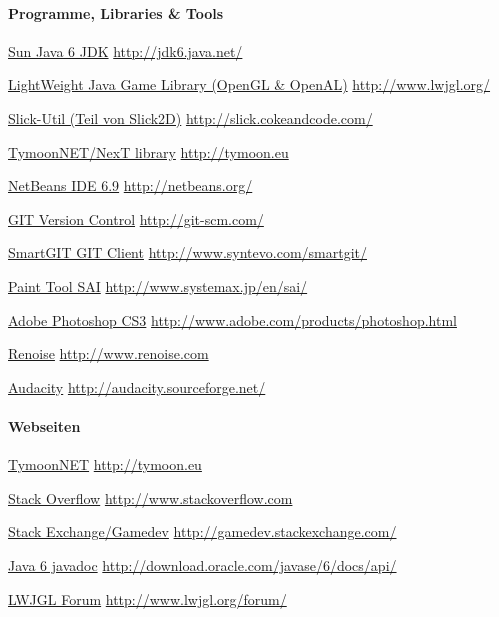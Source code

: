 \documentclass[12pt,a4paper,titlepage]{article}
\begin{document}
		\paragraph{Programme, Libraries \& Tools}
		\begin{itemize*}
			\item \href{http://jdk6.java.net/}{Sun Java 6 JDK} \url{http://jdk6.java.net/}
			\item \href{http://www.lwjgl.org/}{LightWeight Java Game Library (OpenGL \& OpenAL)} \url{http://www.lwjgl.org/}
			\item \href{http://slick.cokeandcode.com/}{Slick-Util (Teil von Slick2D)} \url{http://slick.cokeandcode.com/}
			\item \href{http://tymoon.eu}{TymoonNET/NexT library} \url{http://tymoon.eu}
			\item \href{http://netbeans.org/}{NetBeans IDE 6.9} \url{http://netbeans.org/}
			\item \href{http://git-scm.com/}{GIT Version Control} \url{http://git-scm.com/}
			\item \href{http://www.syntevo.com/smartgit/}{SmartGIT GIT Client} \url{http://www.syntevo.com/smartgit/}
			\item \href{http://www.systemax.jp/en/sai/}{Paint Tool SAI} \url{http://www.systemax.jp/en/sai/}
			\item \href{http://www.adobe.com/products/photoshop.html}{Adobe Photoshop CS3} \url{http://www.adobe.com/products/photoshop.html}
			\item \href{http://www.renoise.com/}{Renoise} \url{http://www.renoise.com}
			\item \href{http://audacity.sourceforge.net/}{Audacity} \url{http://audacity.sourceforge.net/}
		\end{itemize*}
		\paragraph{Webseiten}
		\begin{itemize*}
			\item \href{http://tymoon.eu}{TymoonNET} \url{http://tymoon.eu}
			\item \href{http://www.stackoverflow.com}{Stack Overflow} \url{http://www.stackoverflow.com}
			\item \href{http://gamedev.stackexchange.com/}{Stack Exchange/Gamedev} \url{http://gamedev.stackexchange.com/}
			\item \href{http://download.oracle.com/javase/6/docs/api/}{Java 6 javadoc} \url{http://download.oracle.com/javase/6/docs/api/}
			\item \href{http://www.lwjgl.org/forum/}{LWJGL Forum} \url{http://www.lwjgl.org/forum/}
		\end{itemize*}
\end{document}

